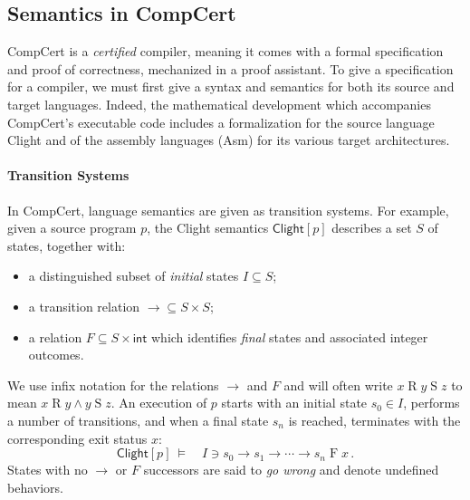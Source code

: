 \documentclass[acmsmall,screen,review,anonymous]{acmart}
\newcommand{\kw}[1]{\ensuremath{ \mathsf{#1} }}
\begin{document}

\subsection{Semantics in CompCert} %

CompCert is a \emph{certified} compiler,
meaning it comes with a formal specification
and proof of correctness,
mechanized in a proof assistant.
To give a specification for a compiler,
we must first give a syntax and semantics
for both its source and target languages.
Indeed,
the mathematical development which accompanies
CompCert's executable code
includes a formalization for the source language Clight
and of the assembly languages (Asm) for its various target architectures.

\paragraph{Transition Systems}

In CompCert,
language semantics are given as transition systems.
For example,
given a source program $p$,
the Clight semantics $\kw{Clight}[p]$
describes a set $S$ of states, together with:
\begin{itemize}
  \item a distinguished subset of \emph{initial} states $I \subseteq S$;
  \item a transition relation ${\rightarrow} \subseteq S \times S$;
  \item a relation $F \subseteq S \times \kw{int}$ which identifies
    \emph{final} states and associated integer outcomes.
\end{itemize}
We use infix notation for the relations $\rightarrow$ and $F$
and will often write $x \mathrel{R} y \mathrel{S} z$
to mean $x \mathrel{R} y \mathrel\wedge y \mathrel{S} z$.
An execution of $p$ starts with an initial state $s_0 \in I$,
performs a number of transitions,
and when a final state $s_n$ is reached,
terminates with the corresponding exit status $x$:
\begin{equation}
  \kw{Clight}[p] \: \vDash \quad
  I \ni s_0 \rightarrow s_1 \rightarrow \cdots \rightarrow s_n \mathrel{F} x
  \,.
  \label{eqn:clightexec}
\end{equation}
States with no $\rightarrow$ or $F$ successors
are said to \emph{go wrong} and denote undefined behaviors.

\end{document}
